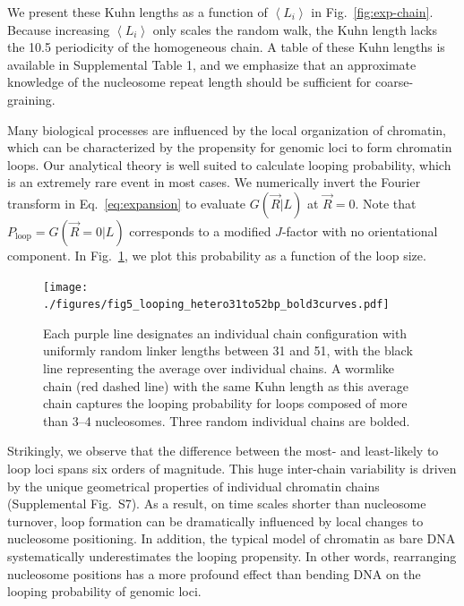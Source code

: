 \documentclass[%
 reprint,
superscriptaddress,
showpacs,preprintnumbers,
 amsmath,amssymb,
 aps,
 prl,
]{revtex4-1}
\newcommand{\greens}[2][\Omega_0; L]{G(#2|#1)}
\newcommand{\meanli}{\left\langle{}L_i\right\rangle}
\begin{document}
We present these Kuhn lengths as a function of $\meanli$ in
    Fig.~\ref{fig:exp-chain}.
Because increasing $\meanli$ only scales the random walk, the Kuhn length lacks
    the \SI{10.5}{\basepair} periodicity of the homogeneous chain.
A table of these Kuhn lengths is available in Supplemental Table 1, and we
    emphasize that an approximate knowledge of the nucleosome repeat length should
    be sufficient for coarse-graining.

Many biological processes are influenced by the local organization of chromatin,
    which can be characterized by the propensity for genomic loci to form
    chromatin loops.
Our analytical theory is well suited to calculate looping probability, which is an
    extremely rare event in most cases.
We numerically invert the Fourier transform in Eq.~\ref{eq:expansion} to evaluate
    $\greens[L]{\vec{R}}$ at $\vec{R} = 0$.
Note that $P_\text{loop}=\greens[L]{\vec{R}=0}$ corresponds to a modified
    $J$-factor with no orientational component.
In Fig.~\ref{fig:looping}, we plot this probability as a function of the loop size.

\begin{figure}
    \centering
    \texttt{[image: ./figures/fig5\_looping\_hetero31to52bp\_bold3curves.pdf]}
    \caption{Each purple line designates an individual chain configuration with
    uniformly random linker lengths between 31 and \SI{51}{\basepair}, with the
    black line representing the average over individual chains. A wormlike chain
    (red dashed line) with the same Kuhn length as this average chain captures the
    looping probability for loops composed of more than 3--4 nucleosomes. Three
    random individual chains are bolded.}\label{fig:looping}
\end{figure}

Strikingly, we observe that the difference between the most- and least-likely to
    loop loci spans six orders of magnitude.
This huge inter-chain variability is driven by the unique geometrical properties
    of individual chromatin chains (Supplemental Fig.~S7).
As a result, on time scales shorter than nucleosome turnover, loop formation can
    be dramatically influenced by local changes to nucleosome positioning.
In addition, the typical model of chromatin as bare DNA systematically
    underestimates the looping propensity. In other words, rearranging
    nucleosome positions has a more profound effect than bending DNA on the
    looping probability of genomic loci.
\end{document}
